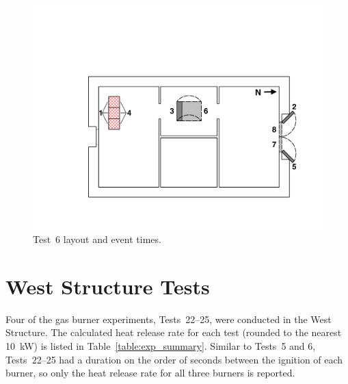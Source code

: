 \begin{figure}[!ht]
\begin{minipage}[b]{0.98\columnwidth}
\begin{center}
\end{center}
\end{minipage}
\begin{minipage}[b]{\columnwidth}
	\vspace{20pt}
	\centering
	\includegraphics[width=0.8\columnwidth]{Figures/Floor_Plans/East_Structure_Test_6}
\end{minipage}
\renewcommand{\baselinestretch}{1}
\caption{Test~6 layout and event times.}
\label{fig:east_test_6}
\end{figure}
\FloatBarrier

\section{West Structure Tests}

Four of the gas burner experiments, Tests~22--25, were conducted in the West Structure. The calculated heat release rate for each test (rounded to the nearest 10~kW) is listed in Table~\ref{table:exp_summary}. Similar to Tests~5 and 6, Tests~22--25 had a duration on the order of seconds between the ignition of each burner, so only the heat release rate for all three burners is reported.

